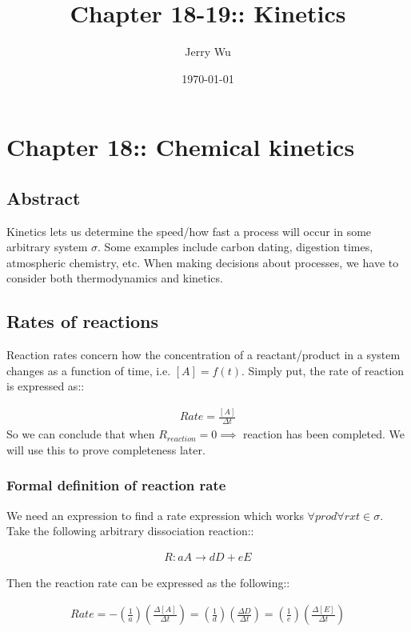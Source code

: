 \documentclass[12pt]{book}
\title{Chapter 18-19:: Kinetics}
\author{Jerry Wu}
\date{\today}
\begin{document}
\maketitle
\chapter*{Chapter 18:: Chemical kinetics}

\section*{Abstract}
Kinetics lets us determine the speed/how fast a process will occur in some arbitrary system $\sigma$. Some examples include carbon dating, digestion times, atmospheric chemistry, etc. When making decisions about processes, we have to consider both thermodynamics and kinetics.

\section*{Rates of reactions}

Reaction rates concern how the concentration of a reactant/product in a system changes as a function of time, i.e. $[A]=f(t)$. Simply put, the rate of reaction is expressed as::

\begin{align*}
    Rate=\frac{[A]}{\Delta t}
\end{align*}
So we can conclude that when $R_{reaction}=0\implies$ reaction has been completed. We will use this to prove completeness later. 

\subsection*{Formal definition of reaction rate}
We need an expression to find a rate expression which works $\forall prod\forall rxt\in \sigma$.
Take the following arbitrary dissociation reaction::

\begin{align*}
    R: aA\rightarrow dD+eE
\end{align*}

Then the reaction rate can be expressed as the following::

\begin{align*}
    Rate=-\left(\frac{1}{a}\right)\left(\frac{\Delta [A]}{\Delta t}\right)=\left(\frac{1}{d}\right)\left(\frac{\Delta D}{\Delta t}\right)=\left(\frac{1}{e}\right)\left(\frac{\Delta [E]}{\Delta t}\right)
\end{align*}
\end{document}
